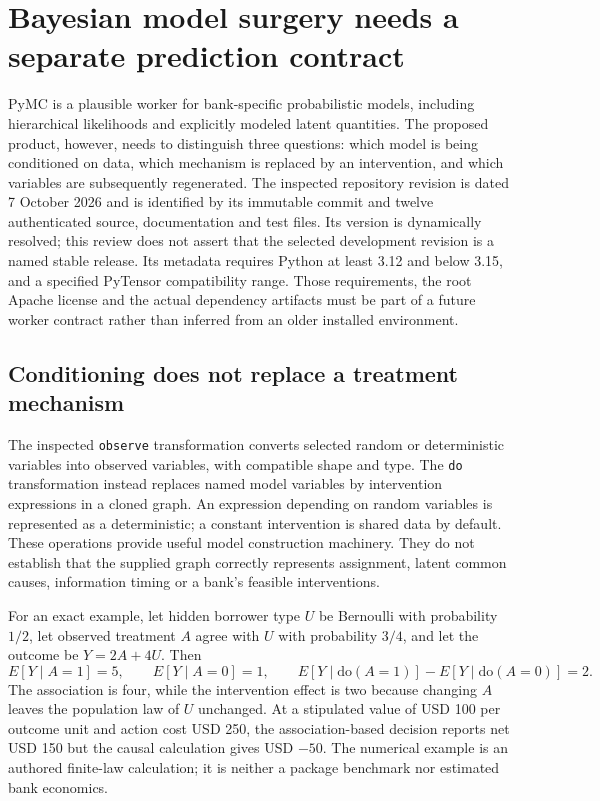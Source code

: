 \section{Bayesian model surgery needs a separate prediction contract}
\label{exec23:pymc-scope}

PyMC is a plausible worker for bank-specific probabilistic models, including
hierarchical likelihoods and explicitly modeled latent quantities. The proposed
product, however, needs to distinguish three questions: which model is being
conditioned on data, which mechanism is replaced by an intervention, and which
variables are subsequently regenerated. The inspected repository revision is
dated 7 October 2026 and is identified by its immutable commit and twelve
authenticated source, documentation and test files. Its version is dynamically
resolved; this review does not assert that the selected development revision is
a named stable release. Its metadata requires Python at least 3.12 and below
3.15, and a specified PyTensor compatibility range. Those requirements, the
root Apache license and the actual dependency artifacts must be part of a
future worker contract rather than inferred from an older installed environment.
\citep{exec23_pymc_sources}

\subsection{Conditioning does not replace a treatment mechanism}
\label{exec23:pymc-intervention}

The inspected \texttt{observe} transformation converts selected random or
deterministic variables into observed variables, with compatible shape and
type. The \texttt{do} transformation instead replaces named model variables
by intervention expressions in a cloned graph. An expression depending on
random variables is represented as a deterministic; a constant intervention
is shared data by default. These operations provide useful model construction
machinery. They do not establish that the supplied graph correctly represents
assignment, latent common causes, information timing or a bank's feasible
interventions.
\citep{exec23_pymc_sources}

For an exact example, let hidden borrower type $U$ be Bernoulli with probability
$1/2$, let observed treatment $A$ agree with $U$ with probability $3/4$, and let
the outcome be $Y=2A+4U$. Then
\[
 E[Y\mid A=1]=5,\qquad E[Y\mid A=0]=1,
 \qquad E[Y\mid\mathrm{do}(A=1)]-E[Y\mid\mathrm{do}(A=0)]=2.
\]
The association is four, while the intervention effect is two because changing
$A$ leaves the population law of $U$ unchanged. At a stipulated value of
USD 100 per outcome unit and action cost USD 250, the association-based decision
reports net USD 150 but the causal calculation gives USD $-50$. The numerical
example is an authored finite-law calculation; it is neither a package
benchmark nor estimated bank economics.
\citep{exec23_pymc_reference}

